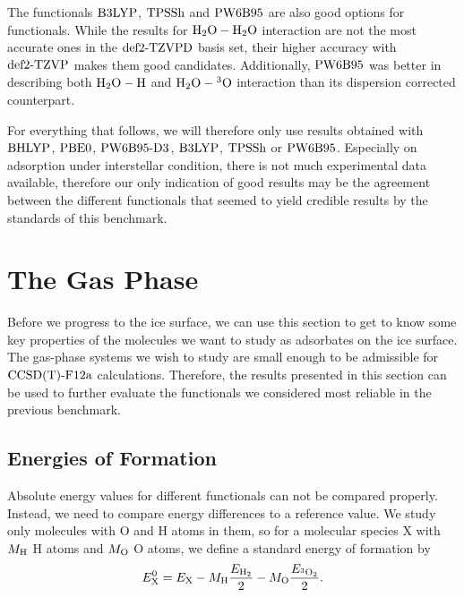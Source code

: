 The functionals $\text{B3LYP}$, $\text{TPSSh}$ and $\text{PW6B95}$ are also good options for
functionals. While the results for $\mbox{\ensuremath{\text H _2 \text O-\text H _2 \text O}}$ interaction are not the most
accurate ones in the $\text{def2-TZVPD}$ basis set, their higher accuracy with $\text{def2-TZVP}$
makes them good candidates. Additionally, $\text{PW6B95}$ was better in describing both
$\mbox{\ensuremath{\text H _2 \text O-\text H}}$ and $\mbox{\ensuremath{\text H _2 \text O-\hspace{.2pt} ^3\text{O}}}$ interaction than its dispersion corrected counterpart.

For everything that follows, we will therefore only use results obtained
with $\text{BHLYP}$, $\text{PBE0}$, $\text{PW6B95}\text{-D3}$, $\text{B3LYP}$, $\text{TPSSh}$ or $\text{PW6B95}$. Especially on
adsorption under interstellar condition, there is not much experimental
data available, therefore our only indication of good results may be
the agreement between the different functionals that seemed to yield credible
results by the standards of this benchmark.
  
\section{The Gas Phase}
\label{Sec:Gas}

Before we progress to the ice surface, we can use this section
to get to know some key properties of the molecules we want to
study as adsorbates on the ice surface. The gas-phase systems
we wish to study are small enough to be admissible for $\text{CCSD(T)-F12a}$
calculations. Therefore, the results presented in this section can
be used to further evaluate the functionals we considered most
reliable in the previous benchmark.

\subsection{Energies of Formation}
\label{Sec:Gas:Energy}
Absolute energy values for different functionals can not be compared
properly. Instead, we need to compare energy differences to
a reference value. We study only molecules with O and H atoms
in them, so for a molecular species X with $M_{\text{H}}$ H atoms and 
$M_{\text O}$ O atoms, we define a standard energy of formation
by
\begin{equation}
E^0_{\text X}=E_{\text X} - M_{\text H} \frac {E_{\text H_2}} 2 - M_{\text O} \frac {E_{{^3\text O_2}}} 2.
\label{Gas:FormationEnergy} 
\end{equation}

